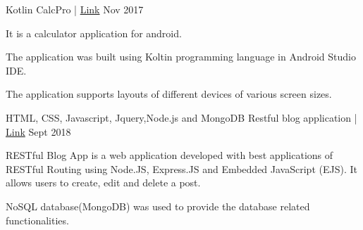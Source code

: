 \begin{cventries}
{\begin{cvitems}
      \end{cvitems}
      }
  \vspace{0.4 cm}
    \cventry
    {\textnormal{Kotlin}} %
    {CalcPro | \href{https://github.com/Rpmalukani22/CALCPRO-app}{ Link}} %
    { } %
    {Nov 2017} %
    {
      \begin{cvitems} %
        \item {It is a calculator application for android.}
        \item{The application was built using Koltin programming language in Android Studio IDE.}
        \item{The application supports layouts of different devices of various screen sizes.}
      \end{cvitems}
    }

 \cventry
    {\textnormal{HTML, CSS, Javascript, Jquery,Node.js and MongoDB}} %
   { Restful blog application | \href{https://github.com/Rpmalukani22/RESTful-Blog-app}{ Link}} %
    { } %
    {Sept 2018} %
    {
      \begin{cvitems} %
        \item { RESTful Blog App is a web application developed with best applications of RESTful Routing using Node.JS, Express.JS and Embedded JavaScript (EJS). It allows users to create, edit and delete a post. }
        \item{NoSQL database(MongoDB) was used to provide the database related functionalities.}
      \end{cvitems}
    }


\end{cventries}
